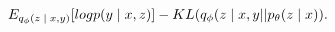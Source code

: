 \begin{equation}
E_{q_{\phi}(z \; | \;{x, y})}  [logp(y \; | \;{x, z} ) ] - KL (q_{\phi}(z \; | \;{x, y} || p_{\theta}(z \; | \;{x})).
\end{equation}













